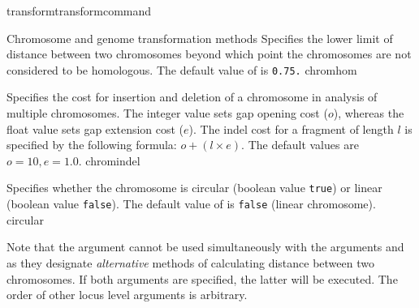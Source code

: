 \begin{command}{transform}{transformcommand}
\begin{arguments}
\begin{argumentgroup}{Chromosome and genome transformation methods}
            {Specifies the lower limit of distance between two chromosomes beyond which 
            point the chromosomes are not considered to be homologous. 
            The default value of  is \texttt{0.75.}}
            {chromhom}
      
                {Specifies the cost for insertion and deletion of a chromosome in analysis of
                multiple chromosomes. The integer value sets gap opening
                cost ($o$), whereas the float value sets gap extension
                cost ($e$).  The indel cost for a fragment of length $l$ is
                specified by the following formula:
                    $o + (l \times e)$. The default values are $o=10, e=1.0$.}
                {chromindel}
 
                {Specifies whether the chromosome is circular (boolean value
                \texttt{true}) or linear (boolean value \texttt{false}). The
                default value of  is \texttt{false}
                (linear chromosome).}
                {circular}
             
                \begin{statement}
  		 Note that the argument  %
		 cannot be used simultaneously
                with the arguments  and
                 as they designate
                \emph{alternative} methods of calculating distance between two
                chromosomes.  If both arguments are specified, the latter will
                be executed. The order of other locus level arguments is
                arbitrary.
	  \end{statement}
		

\end{argumentgroup}
\end{arguments}
\end{command}
